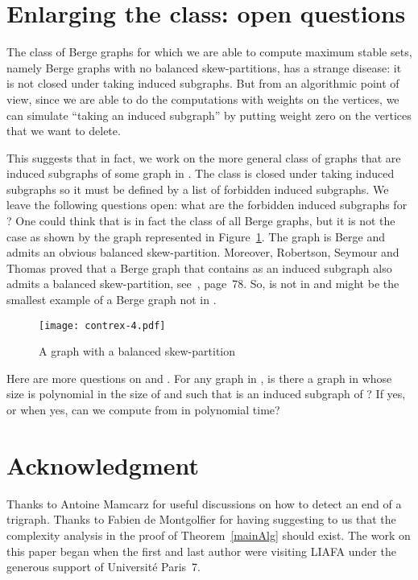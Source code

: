\documentclass[11 pt] {article}
\begin{document}
\section{Enlarging the class: open questions}
\label{sec:enlarge}

 The class  of Berge graphs for which we are able to compute maximum
 stable sets, namely Berge graphs with no balanced skew-partitions, has a
 strange disease: it is not closed under taking induced subgraphs.
  But from an algorithmic point of view,
 since we are able to do the computations with weights on the
 vertices, we can simulate ``taking an induced subgraph'' by putting
 weight zero on the vertices that we want to delete.

This suggests that in fact, we work on the more general class  of graphs that are  induced subgraphs of some graph in
.  The class  is closed under taking
induced subgraphs so it must be defined by a list of forbidden induced
subgraphs.  We leave the following questions open: what are the
forbidden induced subgraphs for ?  One could think that
 is in fact the class of all Berge graphs, but it is not
the case as shown by the graph  represented
in Figure~\ref{fig:contrex4}.  The graph  is Berge and admits an obvious
balanced skew-partition.  Moreover,  Robertson, Seymour and Thomas proved
that a Berge graph that contains  as an induced subgraph also
admits a balanced skew-partition, see~\cite{seymour:how}, page~78.
So,  is not in  and  might be the smallest example of
a Berge graph not in .


\begin{figure}
  \begin{center}
    \texttt{[image: contrex-4.pdf]}
    \caption{A graph with a balanced skew-partition\label{fig:contrex4}}
  \end{center}
\end{figure}

Here are more questions on  and .
For any graph  in , is there a graph  in
 whose size is polynomial in the size of  and such
that  is an induced subgraph of ?  If yes, or when yes, can we
compute  from  in polynomial time?  


\section*{Acknowledgment}

Thanks to Antoine Mamcarz for useful discussions on how to detect an
end of a trigraph. Thanks to Fabien de Montgolfier for having
suggesting to us that the complexity analysis in the proof of
Theorem~\ref{mainAlg} should exist.  The work on this paper began when
the first and last author were visiting LIAFA under the generous
support of Universit\'e Paris~7.
\end{document}
